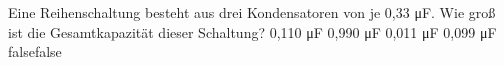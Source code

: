     {Eine Reihenschaltung besteht aus drei Kondensatoren von je 0,33 μF. Wie groß ist die Gesamtkapazität dieser Schaltung?}
    {0,110 μF}
    {0,990 μF}
    {0,011 μF}
    {0,099 μF}
    {false}{false}